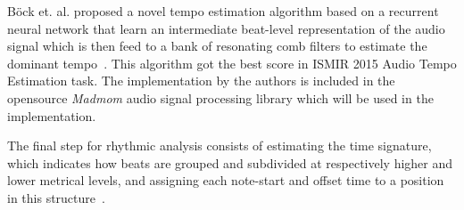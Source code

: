 B\"{o}ck et. al. proposed a novel tempo estimation algorithm based on a recurrent neural network that learn an intermediate
beat-level representation of the audio signal which is then feed to a bank of resonating comb filters to estimate
the dominant tempo~\cite{madmom}. This algorithm got the best score in ISMIR 2015 Audio Tempo Estimation task.
The implementation by the authors is included in the opensource \textit{Madmom} audio signal processing library which
will be used in the implementation.

The final step for rhythmic analysis consists of estimating the time signature, which indicates how beats are grouped
and subdivided at respectively higher and lower metrical levels, and assigning each note-start and offset time to
a position in this structure~\cite{cemgil2011monte}.

